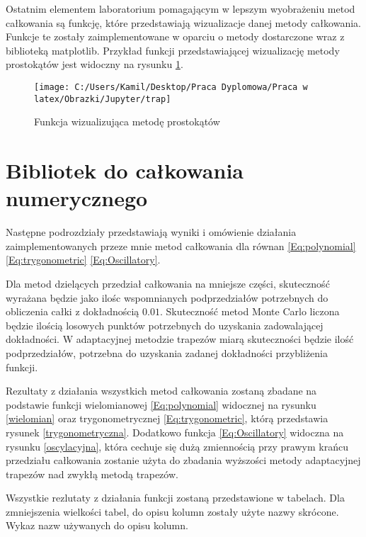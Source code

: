 \documentclass[12pt,twoside]{article}
\begin{document}
Ostatnim elementem laboratorium pomagającym w lepszym wyobrażeniu metod całkowania są funkcję, które przedstawiają wizualizacje danej metody całkowania. Funkcje te zostały zaimplementowane w oparciu o metody dostarczone wraz z biblioteką matplotlib. 
Przykład funkcji przedstawiającej wizualizację metody prostokątów jest widoczny na rysunku \ref{prostokat}.

\begin{figure}[H]
\centering
\texttt{[image: C:/Users/Kamil/Desktop/Praca Dyplomowa/Praca w latex/Obrazki/Jupyter/trap]}
\caption{Funkcja wizualizująca metodę prostokątów}
\label{prostokat}
\end{figure}

\section{Bibliotek do całkowania numerycznego}
Następne podrozdziały przedstawiają wyniki i omówienie działania zaimplementowanych przeze mnie metod całkowania dla równan \eqref{Eq:polynomial} \eqref{Eq:trygonometric} \eqref{Eq:Oscillatory}. 

Dla metod dzielących przedział całkowania na mniejsze części, skuteczność wyrażana będzie jako ilośc wspomnianych podprzedziałów potrzebnych do obliczenia całki z dokładnością $0.01$.
Skuteczność metod Monte Carlo liczona będzie ilością losowych punktów potrzebnych do uzyskania zadowalającej dokładności.
W adaptacyjnej metodzie trapezów miarą skuteczności będzie ilość podprzedziałów, potrzebna do uzyskania zadanej dokładności przybliżenia funkcji.

Rezultaty z działania wszystkich metod całkowania zostaną zbadane na podstawie funkcji wielomianowej \eqref{Eq:polynomial} widocznej na rysunku \ref{wielomian} oraz trygonometrycznej \eqref{Eq:trygonometric}, którą przedstawia rysunek \ref{trygonometryczna}. Dodatkowo funkcja \eqref{Eq:Oscillatory} widoczna na rysunku \ref{oscylacyjna}, która cechuje się dużą zmiennością przy prawym krańcu przedziału całkowania zostanie użyta do zbadania wyższości metody adaptacyjnej trapezów nad zwykłą metodą trapezów.

Wszystkie rezlutaty z działania funkcji zostaną przedstawione w tabelach. Dla zmniejszenia wielkości tabel, do opisu kolumn zostały użyte nazwy skrócone.\mbox{} \\
Wykaz nazw używanych do opisu kolumn.\newline
\end{document}
